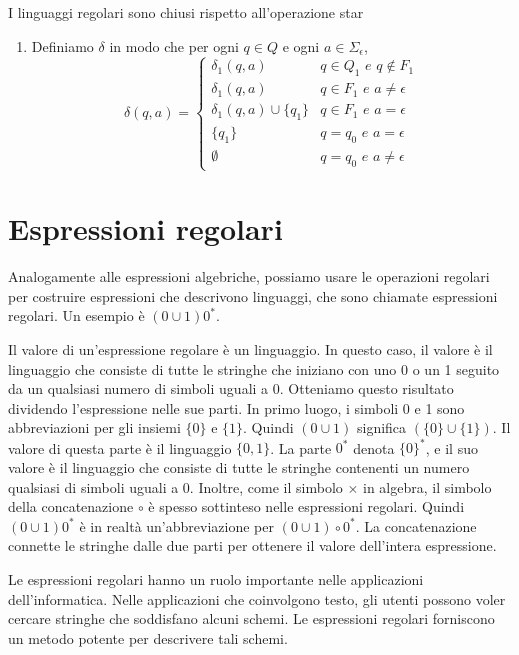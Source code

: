 \begin{Thm}{I linguaggi regolari sono chiusi rispetto all'operazione star}{}
\begin{demonstration}
\begin{enumerate}
    Gli stati accettanti sono i vecchi stati accettanti più il nuovo stato iniziale.

    \item Definiamo $\delta$ in modo che per ogni $q \in Q$ e ogni $a \in \Sigma_{\epsilon}$,
    \begin{equation*}
    \delta(q,a)=\begin{cases}
        \delta_1(q,a)&q\in Q_1 \textit{ e }q \notin F_1\\ \delta_1(q,a)&q \in F_1\textit{ e }a \neq\epsilon\\ \delta_1(q,a)\cup\{q_1\}& q \in F_{1} \textit{ e }a = \epsilon \\ \{q_1\}&q=q_0 \textit{ e } a=\epsilon\\ \emptyset&q=q_0\textit{ e } a\neq\epsilon
    \end{cases}
    \end{equation*}
\end{enumerate}
\end{demonstration}
\end{Thm}

\section{Espressioni regolari}
Analogamente alle espressioni algebriche, possiamo usare le operazioni regolari per costruire espressioni che descrivono linguaggi, che sono chiamate espressioni regolari. Un esempio è $(0\cup 1)0^*$.

Il valore di un'espressione regolare è un linguaggio. In questo caso, il valore è il linguaggio che consiste di tutte le stringhe che iniziano con uno 0 o un 1 seguito da un qualsiasi numero di simboli uguali a 0. Otteniamo questo risultato dividendo l'espressione nelle sue parti. In primo luogo, i simboli 0 e 1 sono abbreviazioni per gli insiemi $\{0\}$ e $\{1\}$. Quindi $(0\cup 1)$ significa $(\{0\} \cup\{1\})$. Il valore di questa parte è il linguaggio $\{0, 1\}$. La parte $0^*$ denota $\{0\}^*$, e il suo valore è il linguaggio che consiste di tutte le stringhe contenenti un numero qualsiasi di simboli uguali a 0. Inoltre, come il simbolo $\times$ in algebra, il simbolo della concatenazione $\circ$ è spesso sottinteso nelle espressioni regolari. Quindi $(0\cup 1)0^*$ è in realtà un'abbreviazione per $(0\cup 1)\circ 0^*$. La concatenazione connette le stringhe dalle due parti per ottenere il valore dell'intera espressione.

Le espressioni regolari hanno un ruolo importante nelle applicazioni dell'informatica. Nelle applicazioni che coinvolgono testo, gli utenti possono voler cercare stringhe che soddisfano alcuni schemi. Le espressioni regolari forniscono un metodo potente per descrivere tali schemi.

